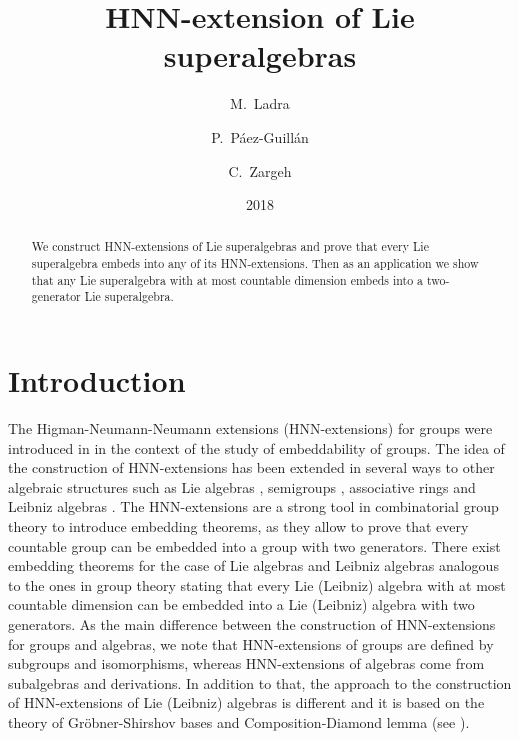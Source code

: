 \documentclass[reqno]{amsart}
\theoremstyle{definition}
\theoremstyle{remark}
\numberwithin{equation}{section}
\begin{document}
\title{HNN-extension of Lie superalgebras}

\author{M.~Ladra }
\address{[M.~Ladra] Departamento de Matem\'aticas, Instituto de Matem\'aticas, Universidade de Santiago de Compostela,
Santiago de Compostela, Spain}


\author{P.~P\'aez-Guill\'an }
\address{[P.~P\'aez-Guill\'an] Departamento de Matem\'aticas, Instituto de Matem\'aticas, Universidade de Santiago de Compostela,
Santiago de Compostela, Spain}

\author{C.~Zargeh }
\address{[C.~Zargeh] Departamento de Matem\'aticas, Instituto de Matem\'aticas, Universidade de Santiago de Compostela,
Santiago de Compostela, Spain}

\date{2018}




\begin{abstract}
We construct HNN-extensions of Lie superalgebras and prove that every  Lie superalgebra embeds into
any of its HNN-extensions. Then as an application we show that any Lie superalgebra with at
most countable dimension embeds into a two-generator Lie superalgebra.
\end{abstract}


\maketitle

\section*{Introduction}
The Higman-Neumann-Neumann extensions (HNN-extensions) for groups  were introduced in \cite{H1} in the context of the study of embeddability of groups. The idea of the construction of HNN-extensions has been extended in several
ways to other algebraic structures such as Lie algebras \cite{L3,W1}, semigroups \cite{H2},  associative rings \cite{D1,L3}  and Leibniz algebras \cite{L1}.
The HNN-extensions are a strong tool in combinatorial group theory to introduce embedding theorems, as they allow to prove
that every countable group can be embedded into a group with two generators. There exist embedding theorems for the case of Lie algebras and Leibniz algebras
 analogous to the ones in group theory stating that every Lie (Leibniz) algebra with at most countable dimension can be embedded into a Lie (Leibniz) algebra with two generators.
   As the main difference between the construction of HNN-extensions for groups and algebras, we note that HNN-extensions of groups are defined by subgroups and isomorphisms,
    whereas HNN-extensions of algebras come from subalgebras and derivations.
     In addition to that, the approach to the construction of HNN-extensions of Lie (Leibniz) algebras is different
     and it is based on the theory of Gr\"obner-Shirshov bases and Composition-Diamond lemma (see \cite{B1}).
\end{document}
